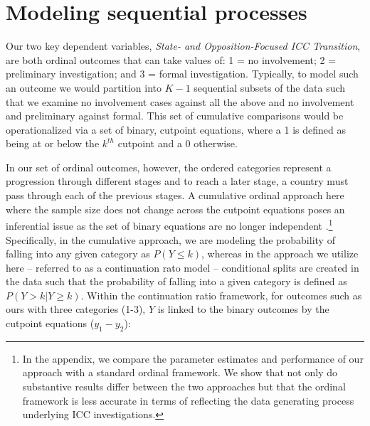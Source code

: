 


\section*{Modeling sequential processes}

Our two key dependent variables, \emph{State- and Opposition-Focused ICC Transition}, are both ordinal outcomes that can take values of: 1 = no involvement; 2 = preliminary investigation; and 3 = formal investigation. Typically, to model such an outcome we would partition into $K-1$ sequential subsets of the data such that we examine no involvement cases against all the above and no involvement and preliminary against formal. This set of cumulative comparisons would be operationalized via a set of binary, cutpoint equations, where a 1 is defined as being at or below the $k^{th}$ cutpoint and a 0 otherwise. %

In our set of ordinal outcomes, however, the ordered categories represent a progression through different stages and to reach a later stage, a country must pass through each of the previous stages. A cumulative ordinal approach here where the sample size does not change across the cutpoint equations poses an inferential issue as the set of binary equations are no longer independent \citep{tutz1990sequential, have:uttal:1994, fienberg2007analysis, agresti:2010}.\footnote{In the appendix, we compare the parameter estimates and performance of our approach with a standard ordinal framework. We show that not only do substantive results differ between the two approaches but that the ordinal framework is less accurate in terms of reflecting the data generating process underlying ICC investigations.} Specifically, in the cumulative approach, we are modeling the probability of falling into any given category as $P(Y \leq k)$, whereas in the approach we utilize here -- referred to as a continuation rato model -- conditional splits are created in the data such that the probability of falling into a given category is defined as $P(Y > k | Y \geq k)$. Within the continuation ratio framework, for outcomes such as ours with three categories (1-3), $Y$ is linked to the binary outcomes by the cutpoint equations ($y_{1} - y_{2}$):

